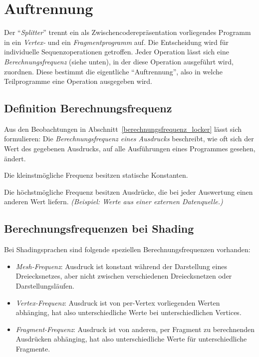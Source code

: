 \documentclass[twoside,a4paper,fleqn,12pt]{book}
\begin{document}
\newpage
\section{Auftrennung}
\label{Auftrennung}

Der "`\emph{Splitter}"' trennt ein als Zwischencoderepräsentation vorliegendes Programm in ein \emph{Vertex-} und ein \emph{Fragmentprogramm} auf.
Die Entscheidung wird für individuelle Sequenzoperationen getroffen. Jeder Operation lässt sich eine \emph{Berechnungsfrequenz} (siehe unten),
in der diese Operation ausgeführt wird, zuordnen.
Diese bestimmt die eigentliche "`Auftrennung"', also in welche Teilprogramme eine Operation ausgegeben wird.

\subsection{Definition Berechnungsfrequenz}
\label{Berechnungsfrequenz}

Aus den Beobachtungen in Abschnitt~\ref{berechnungsfrequenz_locker} lässt sich formulieren:
Die \emph{Berechnungsfrequenz eines Ausdrucks} beschreibt, wie oft sich der Wert des gegebenen Ausdrucks, auf alle Ausführungen eines
Programmes gesehen, ändert.

Die kleinstmögliche Frequenz besitzen statische Konstanten.

Die höchstmögliche Frequenz besitzen Ausdrücke, die bei jeder Auswertung einen anderen Wert liefern.
\emph{(Beispiel: Werte aus einer externen Datenquelle.)}

\subsection{Berechnungsfrequenzen bei Shading}

Bei Shadingsprachen sind folgende speziellen Berechnungsfrequenzen vorhanden:
\begin{itemize}
\item \emph{Mesh-Frequenz}: Ausdruck ist konstant während der Darstellung eines Dreiecksnetzes, aber nicht zwischen
verschiedenen Dreiecksnetzen oder Darstellungsläufen. %
\item \emph{Vertex-Frequenz}: Ausdruck ist von per-Vertex vorliegenden Werten abhänging, hat also unterschiedliche Werte bei unterschiedlichen Vertices. %
\item \emph{Fragment-Frequenz}: Ausdruck ist von anderen, per Fragment zu berechnenden Ausdrücken abhänging,
hat also unterschiedliche Werte für unterschiedliche Fragmente. %
\end{itemize}
\end{document}
